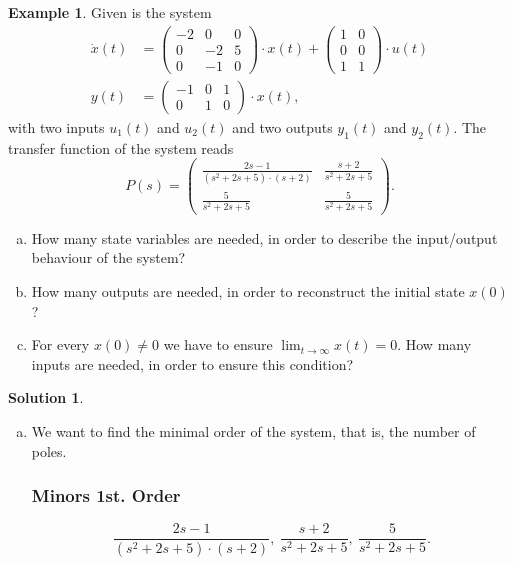 \documentclass[a4paper,12 pt]{article}
\numberwithin{equation}{section}
\theoremstyle{definition}
\newtheorem{bsp}{Example}
\theoremstyle{remark}
\theoremstyle{definition}
\newtheorem*{lsg}{Solution}
\theoremstyle{definition}
\theoremstyle{definition}
\theoremstyle{remark}
\begin{document}
\newpage
\begin{bsp}
Given is the system
\begin{equation*}
\begin{split}
\dot{x}(t)&=\begin{pmatrix}
-2&0&0\\
0&-2&5\\
0&-1&0
\end{pmatrix}\cdot x(t)+\begin{pmatrix} 1&0\\
0&0\\
1&1
\end{pmatrix}\cdot u(t)\\
y(t)&=\begin{pmatrix}
-1&0&1\\ 0&1&0 
\end{pmatrix}\cdot x(t),
\end{split}
\end{equation*}
with two inputs $u_1(t)$ and $u_2(t)$ and two outputs $y_1(t)$ and $y_2(t)$. The transfer function of the system reads
\begin{equation*}
P(s)=\begin{pmatrix}
\frac{2s-1}{(s^2+2s+5)\cdot (s+2)}&\frac{s+2}{s^2+2s+5}\\[6pt]
\frac{5}{s^2+2s+5}&\frac{5}{s^2+2s+5}
\end{pmatrix}.
\end{equation*}
\begin{enumerate}[(a)]
\item How many state variables are needed, in order to describe the input/output behaviour of the system?
\item How many outputs are needed, in order to reconstruct the initial state $x(0)$?
\item For every $x(0)\neq 0$ we have to ensure $\lim_{t\rightarrow \infty}x(t)=0$. How many inputs are needed, in order to ensure this condition?
\end{enumerate}


\newpage
\begin{lsg}
\
\begin{enumerate}[(a)]
\item We want to find the minimal order of the system, that is, the number of poles. \\
\subsubsection*{Minors 1st. Order}
\begin{equation*}
\frac{2s-1}{(s^2+2s+5)\cdot (s+2)},\ \frac{s+2}{s^2+2s+5},\ \frac{5}{s^2+2s+5}.
\end{equation*}

\end{enumerate}
\end{lsg}
\end{bsp}
\end{document}
